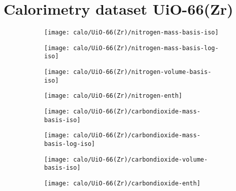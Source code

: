 
\section{Calorimetry dataset UiO-66(Zr)}

\begin{figure}[H]
    \centering

    \begin{subfigure}{0.25\linewidth}
        \texttt{[image: calo/UiO-66(Zr)/nitrogen-mass-basis-iso]}%
        \label{appx:fig:shaping:uio66n2mass}
    \end{subfigure}%
    \begin{subfigure}{0.25\linewidth}
        \texttt{[image: calo/UiO-66(Zr)/nitrogen-mass-basis-log-iso]}%
        \label{appx:fig:shaping:uio66n2masslog}
    \end{subfigure}%
    \begin{subfigure}{0.25\linewidth}
        \texttt{[image: calo/UiO-66(Zr)/nitrogen-volume-basis-iso]}%
        \label{appx:fig:shaping:uio66n2volume}
    \end{subfigure}%
    \begin{subfigure}{0.25\linewidth}
        \texttt{[image: calo/UiO-66(Zr)/nitrogen-enth]}%
        \label{appx:fig:shaping:uio66n2enth}%
    \end{subfigure}%

    \begin{subfigure}{0.25\textwidth}
        \texttt{[image: calo/UiO-66(Zr)/carbondioxide-mass-basis-iso]}%
        \label{appx:fig:shaping:uio66co2mass}
    \end{subfigure}%
    \begin{subfigure}{0.25\textwidth}
        \texttt{[image: calo/UiO-66(Zr)/carbondioxide-mass-basis-log-iso]}%
        \label{appx:fig:shaping:uio66co2masslog}
    \end{subfigure}%
    \begin{subfigure}{0.25\textwidth}
        \texttt{[image: calo/UiO-66(Zr)/carbondioxide-volume-basis-iso]}%
        \label{appx:fig:shaping:uio66co2volume}
    \end{subfigure}%
    \begin{subfigure}{0.25\textwidth}
        \texttt{[image: calo/UiO-66(Zr)/carbondioxide-enth]}%
        \label{appx:fig:shaping:uio66co2enth}%
    \end{subfigure}%


\end{figure}
